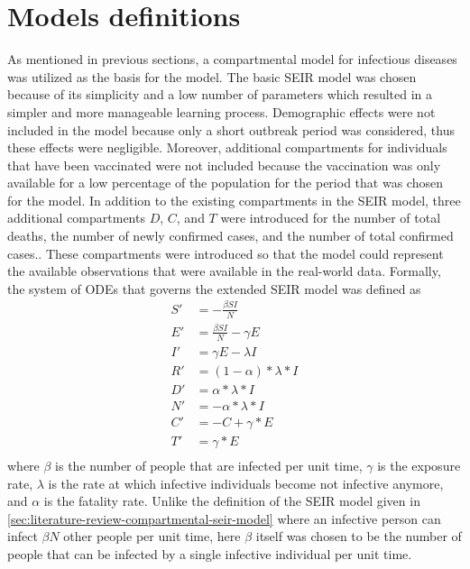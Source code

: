 \section{Models definitions}
\label{sec:methodologies-models-definitions}

As mentioned in previous sections, a compartmental model for infectious diseases was utilized as the basis for the model.
The basic \gls{SEIR} model was chosen because of its simplicity and a low number of parameters which resulted in a simpler and more manageable learning process.
Demographic effects were not included in the model because only a short outbreak period was considered, thus these effects were negligible.
Moreover, additional compartments for individuals that have been vaccinated were not included because the vaccination was only available for a low percentage of the population for the period that was chosen for the model.
In addition to the existing compartments in the \gls{SEIR} model, three additional compartments $D$, $C$, and $T$ were introduced for the number of total deaths, the number of newly confirmed cases, and the number of total confirmed cases..
These compartments were introduced so that the model could represent the available observations that were available in the real-world data.
Formally, the system of \glspl{ODE} that governs the extended \gls{SEIR} model was defined as
\begin{equation}
    \begin{aligned}
        S' &= - \frac{\beta SI}{N} \\
        E' &= \frac{\beta SI}{N} - \gamma E \\
        I' &= \gamma E - \lambda I \\
        R' &= (1 - \alpha) * \lambda * I \\
        D' &= \alpha * \lambda * I \\
        N' &= - \alpha * \lambda * I \\
        C' &= -C + \gamma * E \\
        T' &= \gamma * E \\
    \end{aligned}
    \label{eq:methodologies-seir-model}
\end{equation}
where $\beta$ is the number of people that are infected per unit time, $\gamma$ is the exposure rate, $\lambda$ is the rate at which infective individuals become not infective anymore, and $\alpha$ is the fatality rate.
Unlike the definition of the \gls{SEIR} model given in \autoref{sec:literature-review-compartmental-seir-model} where an infective person can infect $\beta N$ other people per unit time, here $\beta$ itself was chosen to be the number of people that can be infected by a single infective individual per unit time.
